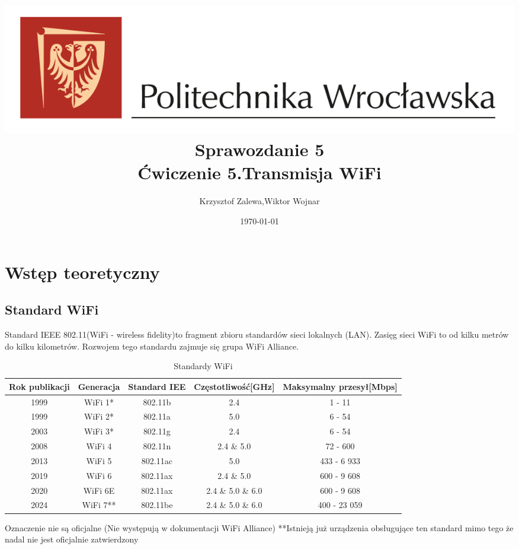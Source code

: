 \documentclass{article}
\title{
  \centering
  \includegraphics[width=\textwidth]{images/logo_PWr_kolor_poziom.png}\\
  \fontsize{28pt}{30pt}\selectfont Sprawozdanie 5\\
  \fontsize{14pt}{30pt}\selectfont Ćwiczenie 5.Transmisja WiFi}
\author{Krzysztof Zalewa,Wiktor Wojnar}
\date{\daymonthyear\today}
\begin{document}
    \maketitle
    \pagebreak
    \tableofcontents
    \FloatBarrier
    \section{Wstęp teoretyczny}
        \subsection{Standard WiFi}
            \raggedright
            Standard IEEE 802.11(WiFi - wireless fidelity)to fragment zbioru standardów sieci lokalnych (LAN).
            Zasięg sieci WiFi to od kilku metrów do kilku kilometrów. Rozwojem tego standardu
            zajmuje się grupa WiFi Alliance.
            \begin{table}[ht]
                \begin{tabular}{|c|c|c|c|c|}
                    \hline
                    Rok publikacji & Generacja & Standard IEE  & Częstotliwość[GHz] & Maksymalny przesył[Mbps] \\ \hline
                    1999 & WiFi 1* & 802.11b & 2.4 & 1 - 11 \\ \hline
                    1999 & WiFi 2* & 802.11a & 5.0 & 6 - 54 \\ \hline
                    2003 & WiFi 3* & 802.11g & 2.4 & 6 - 54 \\ \hline
                    2008 & WiFi 4 & 802.11n & 2.4 \& 5.0 & 72 - 600 \\ \hline
                    2013 & WiFi 5 & 802.11ac & 5.0 & 433 - 6 933 \\ \hline
                    2019 & WiFi 6 & 802.11ax & 2.4 \& 5.0 & 600 - 9 608 \\ \hline
                    2020 & WiFi 6E & 802.11ax & 2.4 \& 5.0 \& 6.0 & 600 - 9 608 \\ \hline
                    2024 & WiFi 7** & 802.11be & 2.4 \& 5.0 \& 6.0 & 400 - 23 059 \\ \hline
                \end{tabular}
                \raggedright
                \small*Oznaczenie nie są oficjalne (Nie występują w dokumentacji WiFi Alliance)\linebreak
                **Istnieją już urządzenia obsługujące ten standard mimo tego że nadal nie jest oficjalnie 
                zatwierdzony
                \caption{Standardy WiFi}
                \label{tab:WiFi_Standards}
            \end{table}
\end{document}
